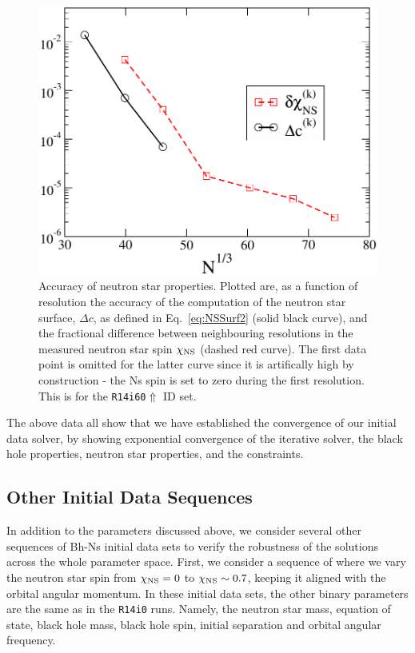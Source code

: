 \begin{figure}
\includegraphics[width=0.95\columnwidth]{chap4/SpinDiff}
\caption[Neutron star surface and spin accuracy.]{\label{fig:SpinDiff}
  Accuracy of neutron star properties. Plotted are, as a function of resolution the accuracy of the computation of the neutron star
  surface, $\Delta c$, as defined in Eq.~\ref{eq:NSSurf2} (solid black
  curve), and the fractional difference between neighbouring
  resolutions in the measured neutron star spin $\chi_{\rm NS}$ (dashed red
  curve). The first data point is omitted for the latter curve since it is artifically high by construction - the Ns spin is set to zero during the first resolution. This is for the {\tt R14i60$\Uparrow$} ID set.}
\end{figure}

The above data all show that we have established the convergence of
our initial data solver, by showing exponential convergence of the
iterative solver, the black hole properties, neutron star properties,
and the constraints.

\subsection{Other Initial Data Sequences}
In addition to the parameters discussed above, we consider several other sequences
of Bh-Ns initial data sets to verify the robustness of the solutions across
the whole parameter space. First, we consider a sequence of where we vary the neutron star spin from
$\chi_{\rm NS}=0$ to $\chi_{\rm NS}\sim0.7$, keeping it aligned with the orbital angular momentum. In these initial data sets, the other binary parameters are the same
as in the {\tt R14i0} runs. Namely, the neutron star mass, equation of state, black hole mass, black hole spin, initial separation and orbital angular frequency.

